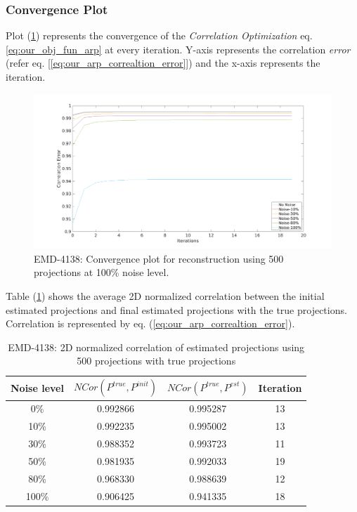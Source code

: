 \documentclass[twoside]{iitbreport}
\begin{document}
\subsubsection{\textbf{Convergence Plot}}

Plot (\ref{figplot:emd_4138_result_Bm3d_convergence}) represents the convergence of the \textit{Correlation Optimization} eq. \ref{eq:our_obj_fun_arp} at every iteration. Y-axis represents the correlation \textit{error} (refer eq. [\ref{eq:our_arp_correaltion_error}]) and the x-axis represents the iteration.

\begin{figure}[H]
\includegraphics[width=1\textwidth]{emd_4138_result_Bm3d_convergence.png}
\centering
\captionsetup{justification=centering}
\caption{EMD-4138: Convergence plot for reconstruction using 500 projections at 100\% noise level. }
\label{figplot:emd_4138_result_Bm3d_convergence}
\end{figure}

Table (\ref{tbl:our_arp_4138_result-2d-correlation}) shows the average 2D normalized correlation between the initial estimated projections and final estimated projections with the true projections. Correlation is represented by eq. (\ref{eq:our_arp_correaltion_error}). 
\begin{table}[H]
    \centering
     \begin{tabular}{||c c c c ||} 
             \hline
             Noise level & $ NCor(P^{true},P^{init})$  &   $ NCor(P^{true},P^{est})$ &  Iteration \\
             \hline\hline
             0\% & 0.992866  & 0.995287 & 13 \\
            \hline
            10\% & 0.992235  & 0.995002 & 13 \\
            \hline
            30\% &0.988352  & 0.993723 & 11  \\
            \hline
            50\% &0.981935  & 0.992033 & 19 \\ 
            \hline
            80\% &0.968330  & 0.988639 & 12 \\
            \hline
            100\% &0.906425  & 0.941335 & 18 \\ [1ex]
            \hline
    \end{tabular}
    \captionsetup{justification=centering}
    \caption{EMD-4138: 2D normalized correlation of estimated projections using 500 projections with true projections }
    \label{tbl:our_arp_4138_result-2d-correlation}
\end{table}
\end{document}
